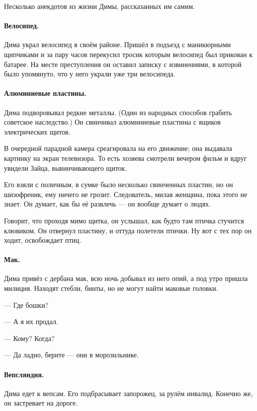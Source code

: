 \documentclass{book}
\begin{document}
Несколько анекдотов из жизни Димы, рассказанных им самим.

\paragraph{Велосипед.}
Дима украл велосипед в своём районе.
Пришёл в подъезд с маникюрными щипчиками и за пару часов перекусил тросик которым велосипед был прикован к батарее.
На месте преступления он оставил записку с извинениями, в которой было упомянуто, что у него украли уже три велосипеда.

{\sloppy

\paragraph{Алюминиевые пластины.}
Дима подворовывал редкие металлы.
(Один из народных способов грабить советское наследство.)
Он свинчивал алюминиевые пластины с ящиков электрических щитов.

}

В очередной парадной камера среагировала на его движение; она выдавала картинку на экран телевизора.
То есть хозяева смотрели вечером фильм и вдруг увидели Зайца, вывинчивающего щиток.

Его взяли с поличным, в сумке было несколько свинченных пластин,
но он шизофреник, ему ничего не грозит.
Следователь, милая женщина, пока этого не знает.
Он думает, как бы её развлечь --- он вообще думает о людях.

Говорит, что проходя мимо щитка, он услышал, как будто там птичка стучится клювиком.
Он отвернул пластину, и оттуда полетели птички.
Ну вот с тех пор он ходит, освобождает птиц.

\paragraph{Мак.}
Дима привёз с дербана мак, всю ночь добывал из него опий, а под утро пришла милиция.
Находят стебли, бинты, но не могут найти маковые головки.

--- Где бошки?

--- А я их продал.

--- Кому? Когда? 

--- Да ладно, берите --- они в морозильнике.

\paragraph{Вепсляндия.}
Дима едет к вепсам.
Его подбрасывает запорожец, за рулём инвалид.
Конечно же, он застревает на дороге.
\end{document}
